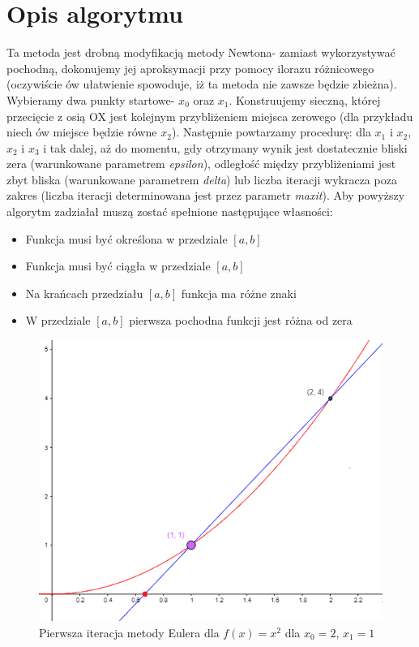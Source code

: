\documentclass[a4paper,14pt]{report}
\begin{document}
  \section{Opis algorytmu}
  Ta metoda jest drobną modyfikacją metody Newtona- zamiast wykorzystywać pochodną, dokonujemy jej aproksymacji przy pomocy ilorazu różnicowego (oczywiście ów ułatwienie spowoduje, iż ta metoda nie zawsze będzie zbieżna).
  Wybieramy dwa punkty startowe- $x_{0}$ oraz $x_{1}$. Konstruujemy sieczną, której przecięcie z osią OX jest kolejnym przybliżeniem miejsca zerowego (dla przykładu niech ów miejsce będzie równe $x_{2}$). Następnie powtarzamy procedurę: dla $x_{1}$ i $x_{2}$, $x_{2}$ i $x_{3}$ i tak dalej, aż do momentu, gdy otrzymany wynik jest dostatecznie bliski zera (warunkowane parametrem \textit{epsilon}), odległość między przybliżeniami jest zbyt bliska (warunkowane parametrem \textit{delta}) lub liczba iteracji wykracza poza zakres (liczba iteracji determinowana jest przez parametr \textit{maxit}).
  Aby powyższy algorytm zadziałał muszą zostać spełnione następujące własności:
  \begin{itemize}
    \item Funkcja musi być określona w przedziale $[a,b]$
    \item Funkcja musi być ciągła w przedziale $[a,b]$
    \item Na krańcach przedziału $[a,b]$ funkcja ma różne znaki
    \item W przedziale $[a,b]$ pierwsza pochodna funkcji jest różna od zera
  \end{itemize}
  \begin{figure}[H]
    \includegraphics[scale=1.0]{zad1c}
    \centering
    \caption{Pierwsza iteracja metody Eulera dla  $f(x)=x^{2}$ dla $x_{0} =2$, $x_{1}=1$ }
  \end{figure}
\end{document}
